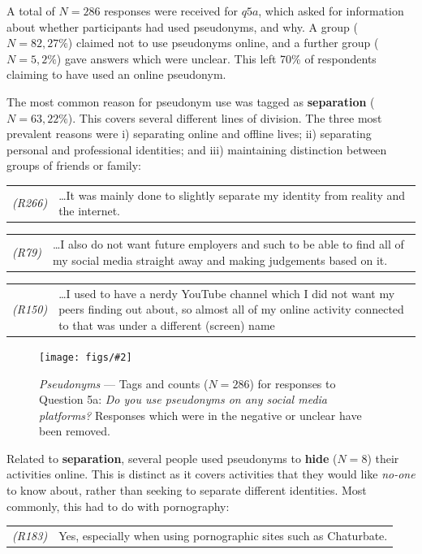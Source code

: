 \documentclass{sig-alternate}
\newcommand{\fig}[3][1.0]{
\begin{figure}[tbp]
\begin{center}
\texttt{[image: figs/\#2]}
\protect\caption{#3}
\label{fig:#2}
\end{center}
\end{figure}
}
\newcommand{\stag}[1]{\textbf{#1}}
\newcommand{\example}[2]{%

\vspace{0.10cm}

\hspace{-3.9ex} \begin{tabular}{ p{0.6cm} p{7.15cm} }
    {\it \small (R#1)} & #2 \\
\end{tabular}%
\vspace{0.10cm}

}
\begin{document}

A total of $N=286$ responses were received for $q5a$, which 
asked for information about whether participants had used pseudonyms, and why. A group ($N=82,27\%$) claimed not to use pseudonyms online, and a further group ($N=5,2\%$) gave answers which were unclear.  This left 70\% of respondents claiming to have used an online pseudonym. 

The most common reason for pseudonym use was tagged as \stag{separation} ($N=63, 22\%$). This covers several different lines of division. The three most prevalent reasons were i) separating online and offline lives; ii) separating personal and professional identities; and iii) maintaining distinction between groups of friends or family:
\example{266}{\ldots It was mainly done to slightly separate my identity from reality and the internet.}
\example{79}{\ldots I also do not want future employers and such to be able to find all of my social media straight away and making judgements based on it.}
\example{150}{\ldots I used to have a nerdy YouTube channel which I did not want my peers finding out about, so almost all of my online activity connected to that was under a different (screen) name}


\fig{q5afrequency}{\emph{Pseudonyms} --- Tags and counts ($N=286$) for responses to Question 5a: \emph{Do you use pseudonyms on any social media platforms?} Responses which were in the negative or unclear have been removed.}


Related to \stag{separation}, several people used pseudonyms to \stag{hide} ($N=8$) their activities online. This is distinct as it covers activities that they would like \emph{no-one} to know about, rather than seeking to separate different identities. Most commonly, this had to do with pornography:
\example{183}{Yes, especially when using pornographic sites such as Chaturbate.}
\end{document}
